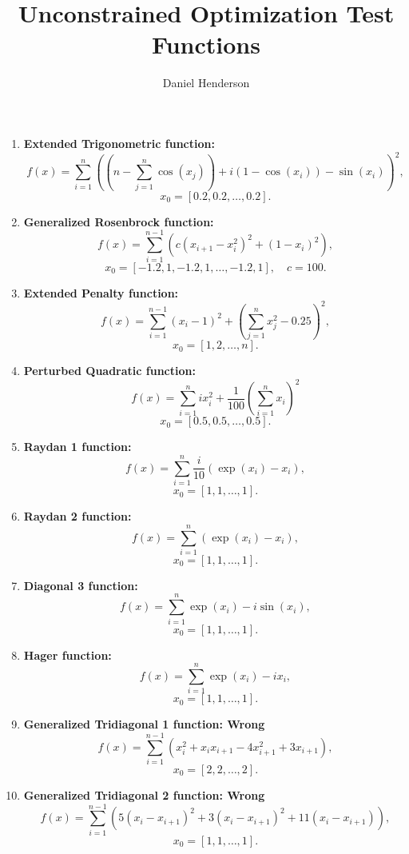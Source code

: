 \documentclass[10pt]{article}
\title{Unconstrained Optimization Test Functions}
\author{Daniel Henderson}
\begin{document}
\begin{enumerate}
    \item \textbf{Extended Trigonometric function:}
    \[
    f(x) = \sum_{i=1}^{n} \left( (n - \sum_{j=1}^{n} \cos(x_j)) + i \left( 1 - \cos(x_i) \right) - \sin(x_i) \right)^2,
    \]
    \[
    x_0 = [0.2, 0.2, \dots, 0.2].
    \]


    \item \textbf{Generalized Rosenbrock function:}
    \[
    f(x) = \sum_{i=1}^{n-1} \left( c(x_{i+1} - x_i^2)^2 + (1 - x_i)^2 \right),
    \]
    \[
    x_0 = [-1.2, 1, -1.2, 1, \dots, -1.2, 1], \quad c = 100.
    \]

    \item \textbf{Extended Penalty function:}
    \[
    f(x) =  \sum_{i=1}^{n-1} (x_i - 1)^2 + \left(\sum_{j=1}^{n}  x_j^2 - 0.25 \right)^2,
    \]
    \[
    x_0 = [1, 2, \dots, n].
    \]

    \item \textbf{Perturbed Quadratic function:}
    \[
    f(x) = \sum_{i=1}^{n} i x_i^2 + \frac{1}{100}\left(\sum_{i=1}^{n} x_i \right)^2
    \]
    \[
    x_0 = [0.5, 0.5, \dots, 0.5].
    \]

    \item \textbf{Raydan 1 function:}
    \[
    f(x) = \sum_{i=1}^{n} \frac{i}{10}(\exp(x_i) - x_i),
    \]
    \[
    x_0 = [1, 1, \dots, 1].
    \]

    \item \textbf{Raydan 2 function:}
    \[
    f(x) = \sum_{i=1}^{n} (\exp(x_i) - x_i),
    \]
    \[
    x_0 = [1, 1, \dots, 1].
    \]

    \item \textbf{Diagonal 3 function:}
    \[
    f(x) = \sum_{i=1}^{n} \exp(x_i) - i \sin(x_i),
    \]
    \[
    x_0 = [1, 1, \dots, 1].
    \]

    \item \textbf{Hager function:}
    \[
    f(x) = \sum_{i=1}^{n} \exp(x_i) - i x_i,
    \]
    \[
    x_0 = [1, 1, \dots, 1].
    \]

    \item \textbf{Generalized Tridiagonal 1 function: Wrong}
    \[
    f(x) = \sum_{i=1}^{n-1} \left( x_i^2 + x_i x_{i+1} - 4 x_{i+1}^2 + 3 x_{i+1} \right),
    \]
    \[
    x_0 = [2, 2, \dots, 2].
    \]

    \item \textbf{Generalized Tridiagonal 2 function: Wrong}
    \[
    f(x) = \sum_{i=1}^{n-1} \left( 5(x_i - x_{i+1})^2 + 3(x_i - x_{i+1})^2 + 11(x_i - x_{i+1}) \right),
    \]
    \[
    x_0 = [1, 1, \dots, 1].
    \]


\end{enumerate}
\end{document}
